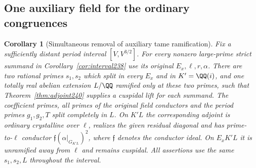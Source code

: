 \documentclass[a4paper,11pt]{article}
\newtheorem{corollary}[proposition]{Corollary}
\theoremstyle{definition}
\theoremstyle{remark}
\numberwithin{equation}{section}
\begin{document}
\subsection{One auxiliary field for the ordinary congruences}\label{nav:II-45}
\begin{corollary}[Simultaneous removal of auxiliary tame ramification]
\label{cor:common240}
Fix a sufficiently distant period interval \([V,V^{3/2}]\).
For every nonzero large-prime strict summand in
Corollary~\ref{cor:interval238} use its original \(E_x,\ell,r,\alpha\).
There are two rational primes \(s_1,s_2\) which split in every
\(E_x\) and in \(K'=\QQ(i)\), and one totally real abelian
extension \(L/\QQ\) ramified only at these two primes, such
that Theorem~\ref{thm:adjoint240} supplies a cuspidal lift for
each summand. The coefficient primes, all primes of the original
field conductors and the period primes \(g_1,g_2,T\) split
completely in \(L\). On \(K'L\) the corresponding adjoint is
ordinary crystalline over \(\ell\), realizes the given residual
diagonal and has prime-to-\(\ell\) conductor
\(\mathfrak f(\alpha|_{G_{K'L}})^2\), where \(\mathfrak f\)
denotes the conductor ideal. On \(E_xK'L\) it is unramified
away from \(\ell\) and remains cuspidal. All assertions use
the same \(s_1,s_2,L\) throughout the interval.
\end{corollary}
\end{document}
